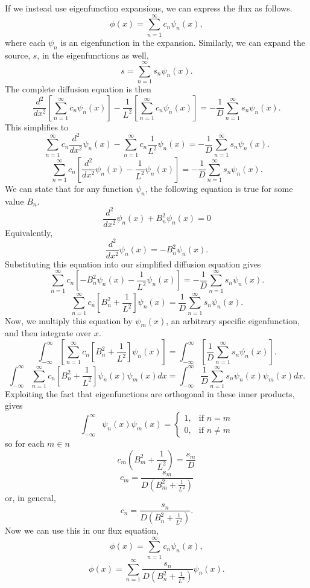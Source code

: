 \documentclass{article}
\begin{document}
If we instead use eigenfunction expansions, we can express the flux as follows.
$$ \phi(x) = \sum_{n=1}^{\infty} c_n \psi_n(x) ,$$
where each $\psi_n$ is an eigenfunction in the expansion. Similarly, we can expand the source, $s$, in the eigenfunctions as well,
$$ s = \sum_{n=1}^{\infty} s_n \psi_n(x) .$$
The complete diffusion equation is then
$$ \frac{d^2}{dx^2}\left[\sum_{n=1}^{\infty} c_n \psi_n(x)\right] - \frac{1}{L^2}\left[\sum_{n=1}^{\infty} c_n \psi_n(x)\right] = -\frac{1}{D}\sum_{n=1}^{\infty} s_n \psi_n(x) .$$
This simplifies to 
$$ \sum_{n=1}^{\infty} c_n \frac{d^2}{dx^2}\psi_n(x) - \sum_{n=1}^{\infty} c_n \frac{1}{L^2}\psi_n(x) = -\frac{1}{D}\sum_{n=1}^{\infty} s_n \psi_n(x) .$$
$$ \sum_{n=1}^{\infty} c_n \left[\frac{d^2}{dx^2}\psi_n(x) - \frac{1}{L^2}\psi_n(x)\right] = -\frac{1}{D}\sum_{n=1}^{\infty} s_n \psi_n(x) .$$
We can state that for any function $\psi_n$, the following equation is true for some value $B_n$.
$$ \frac{d^2}{dx^2}\psi_n(x) + B_n^2\psi_n(x) = 0 $$
Equivalently,
$$ \frac{d^2}{dx^2}\psi_n(x) = -B_n^2\psi_n(x) .$$
Substituting this equation into our simplified diffusion equation gives
$$ \sum_{n=1}^{\infty} c_n \left[-B_n^2\psi_n(x) - \frac{1}{L^2}\psi_n(x)\right] = -\frac{1}{D}\sum_{n=1}^{\infty} s_n \psi_n(x) .$$
$$ \sum_{n=1}^{\infty} c_n \left[B_n^2 + \frac{1}{L^2}\right]\psi_n(x) = \frac{1}{D}\sum_{n=1}^{\infty} s_n \psi_n(x) .$$
Now, we multiply this equation by $\psi_m(x)$, an arbitrary specific eigenfunction, and then integrate over $x$. 
$$ \int_{-\infty}^{\infty} \left[ \sum_{n=1}^{\infty} c_n \left[B_n^2 + \frac{1}{L^2}\right]\psi_n(x) \right] = \int_{-\infty}^{\infty} \left[ \frac{1}{D}\sum_{n=1}^{\infty} s_n \psi_n(x) \right] .$$
$$ \int_{-\infty}^{\infty} \sum_{n=1}^{\infty} c_n \left[B_n^2 + \frac{1}{L^2}\right]\psi_n(x)\psi_m(x) dx = \int_{-\infty}^{\infty} \frac{1}{D}\sum_{n=1}^{\infty} s_n \psi_n(x)\psi_m(x) dx .$$
Exploiting the fact that eigenfunctions are orthogonal in these inner products, gives
$$ \int_{-\infty}^{\infty} \psi_n(x)\psi_m(x) = \begin{cases}	1, & \text{if }n = m \\
																0, & \text{if } n \neq m \end{cases}$$
so for each $m \in n$
$$ c_m \left( B_m^2 + \frac{1}{L^2} \right) = \frac{s_m}{D} $$
$$ c_m  = \frac{s_m}{D\left( B_m^2 + \frac{1}{L^2} \right)} $$
or, in general,
$$ c_n  = \frac{s_n}{D\left( B_n^2 + \frac{1}{L^2} \right)}. $$
Now we can use this in our flux equation,
$$ \phi(x) = \sum_{n=1}^{\infty} c_n \psi_n(x) ,$$
$$ \phi(x) = \sum_{n=1}^{\infty} \frac{s_n}{D\left( B_n^2 + \frac{1}{L^2} \right)} \psi_n(x) .$$
\end{document}
